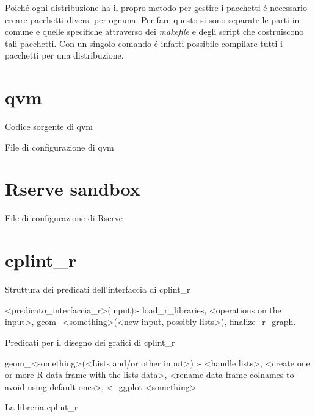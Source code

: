 \documentclass[10pt,titlepage,twoside,a4paper]{report}
\newenvironment{code}{\singlespacing\captionsetup{type=listing}}{}
\begin{document}
Poich\'e ogni distribuzione ha il propro metodo per gestire i pacchetti \'e 
necessario creare pacchetti diversi per ognuna. Per fare questo si sono 
separate le parti in comune e quelle specifiche attraverso dei \emph{makefile}
e degli script che costruiscono tali pacchetti. Con un singolo comando \'e 
infatti possibile compilare tutti i pacchetti per una distribuzione.



\appendix
\chapter{qvm} \label{app:qvm}

    \begin{code}
        \caption{Codice sorgente di qvm}
    \end{code}

    \newpage

    \begin{code}
        \caption{File di configurazione di qvm}
    \end{code}




\chapter{Rserve sandbox} \label{app:rserve-sandbox}
    \begin{code}
        \caption{File di configurazione di Rserve}
    \end{code}

\chapter{cplint\_r} \label{app:cplint-r}
    \begin{code}
        \caption{Struttura dei predicati dell'interfaccia di cplint\_r}
        \begin{prologcode*}{}
<predicato_interfaccia_r>(input):-
    load_r_libraries,
    <operations on the input>,
    geom_<something>(<new input, possibly lists>),
    finalize_r_graph.
        \end{prologcode*}
    \end{code}

    \begin{code}
        \caption{Predicati per il disegno dei grafici di cplint\_r}
        \begin{prologcode*}{}
geom_<something>(<Lists and/or other input>) :-
    <handle lists>,
    <create one or more R data frame with the lists data>,
    <rename data frame colnames to avoid using default ones>,
    <- ggplot <something>
        \end{prologcode*}
    \end{code}

    \begin{code}
        \caption{La libreria cplint\_r}
    \end{code}






\end{document}
